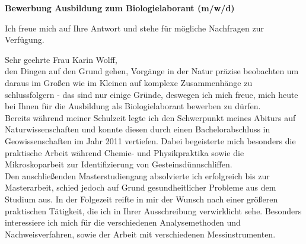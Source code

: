 \documentclass[11pt,a4paper,roman]{moderncv}
\begin{document}
\recipient{~}{ }
\date{\today}
\opening{\textbf{Bewerbung Ausbildung zum Biologielaborant (m/w/d)
}}
\closing{Ich freue mich auf Ihre Antwort und stehe für mögliche Nachfragen zur Verfügung.}
\makelettertitle


Sehr geehrte Frau Karin Wolff,\\
den Dingen auf den Grund gehen, Vorgänge in der Natur präzise beobachten um daraus im Großen wie im Kleinen auf komplexe Zusammenhänge zu schlussfolgern - das sind nur einige Gründe, deswegen ich mich freue, mich heute bei Ihnen für die Ausbildung als Biologielaborant bewerben zu dürfen.\\
\vspace{5mm}
Bereits während meiner Schulzeit legte ich den Schwerpunkt meines Abiturs auf Naturwissenschaften und konnte diesen durch einen Bachelorabschluss in Geowissenschaften im Jahr 2011 vertiefen. Dabei begeisterte mich besonders die praktische Arbeit während Chemie- und Physikpraktika sowie die Mikroskoparbeit zur Identifizierung von Gesteinsdünnschliffen.\\
Den anschließenden Masterstudiengang absolvierte ich erfolgreich bis zur Masterarbeit, schied jedoch auf Grund gesundheitlicher Probleme aus dem Studium aus. In der Folgezeit reifte in mir der Wunsch nach einer größeren praktischen Tätigkeit, die ich in Ihrer Ausschreibung verwirklicht sehe.
Besonders interessiere ich mich für die verschiedenen Analysemethoden und Nachweisverfahren, sowie der  Arbeit mit verschiedenen Messinstrumenten.\\
\vspace{5mm}
\end{document}
